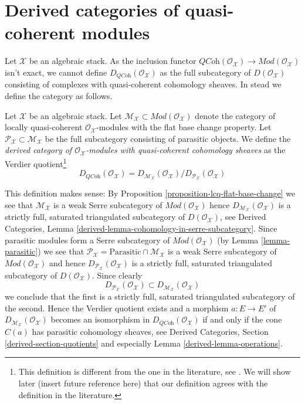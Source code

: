 \section{Derived categories of quasi-coherent modules}
\label{section-derived}

\noindent
Let $\mathcal{X}$ be an algebraic stack. As the inclusion functor
$\textit{QCoh}(\mathcal{O}_\mathcal{X}) \to
\textit{Mod}(\mathcal{O}_\mathcal{X})$ isn't exact, we cannot define
$D_{\textit{QCoh}}(\mathcal{O}_\mathcal{X})$ as the full subcategory
of $D(\mathcal{O}_\mathcal{X})$ consisting of complexes with quasi-coherent
cohomology sheaves. In stead we define the category as follows.

\begin{definition}
\label{definition-derived}
Let $\mathcal{X}$ be an algebraic stack. Let
$\mathcal{M}_\mathcal{X} \subset \textit{Mod}(\mathcal{O}_\mathcal{X})$
denote the category of locally quasi-coherent
$\mathcal{O}_\mathcal{X}$-modules with the flat base change property.
Let $\mathcal{P}_\mathcal{X} \subset \mathcal{M}_\mathcal{X}$
be the full subcategory consisting of parasitic objects.
We define the {\it derived category of $\mathcal{O}_\mathcal{X}$-modules with
quasi-coherent cohomology sheaves} as the Verdier quotient\footnote{This
definition is different from the one in the literature, see
\cite[6.3]{olsson_sheaves}. We will show later (insert future reference
here) that our definition
agrees with the definition in the literature.}
$$
D_{\textit{QCoh}}(\mathcal{O}_\mathcal{X}) =
D_{\mathcal{M}_\mathcal{X}}(\mathcal{O}_\mathcal{X})/
D_{\mathcal{P}_\mathcal{X}}(\mathcal{O}_\mathcal{X})
$$
\end{definition}

\noindent
This definition makes sense: By
Proposition \ref{proposition-lcq-flat-base-change}
we see that $\mathcal{M}_\mathcal{X}$ is a weak Serre subcategory
of $\textit{Mod}(\mathcal{O}_\mathcal{X})$
hence $D_{\mathcal{M}_\mathcal{X}}(\mathcal{O}_\mathcal{X})$
is a strictly full, saturated triangulated subcategory of
$D(\mathcal{O}_\mathcal{X})$, see
Derived Categories, Lemma \ref{derived-lemma-cohomology-in-serre-subcategory}.
Since parasitic modules form a Serre subcategory of
$\textit{Mod}(\mathcal{O}_\mathcal{X})$ (by
Lemma \ref{lemma-parasitic}) we see that
$\mathcal{P}_\mathcal{X} = \text{Parasitic} \cap \mathcal{M}_\mathcal{X}$
is a weak Serre subcategory of $\textit{Mod}(\mathcal{O}_\mathcal{X})$ and
hence $D_{\mathcal{P}_\mathcal{X}}(\mathcal{O}_\mathcal{X})$
is a strictly full, saturated triangulated subcategory of
$D(\mathcal{O}_\mathcal{X})$. Since clearly
$$
D_{\mathcal{P}_\mathcal{X}}(\mathcal{O}_\mathcal{X})
\subset
D_{\mathcal{M}_\mathcal{X}}(\mathcal{O}_\mathcal{X})
$$
we conclude that the first is a strictly full, saturated triangulated
subcategory of the second. Hence the Verdier quotient exists and
a morphism $a : E \to E'$ of
$D_{\mathcal{M}_\mathcal{X}}(\mathcal{O}_\mathcal{X})$ becomes an
isomorphism in $D_{\textit{QCoh}}(\mathcal{O}_\mathcal{X})$ if and
only if the cone $C(a)$ has parasitic cohomology sheaves, see
Derived Categories, Section \ref{derived-section-quotients} and especially
Lemma \ref{derived-lemma-operations}.











